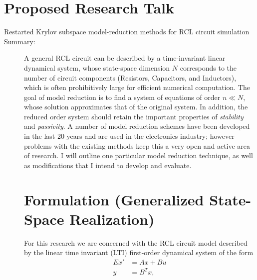\documentclass[letterpaper]{article}
\theoremstyle{remark}
\begin{document}
\section*{Proposed Research Talk}
	\begin{description}
		\item[Restarted Krylov subspace model-reduction methods for 
		RCL circuit simulation]

		\item[Summary:] A general RCL circuit can be described by a time-invariant 
		linear dynamical system, whose state-space dimension $N$ corresponds to the
		number of circuit components (Resistors, Capacitors, and Inductors),
		which is often prohibitively large for efficient numerical computation. The goal
		of model reduction is to find a system of equations of order $n\ll N$, whose solution
		approximates that of the original system.  In addition, the reduced order system 
		should retain the important properties of \emph{stability} and \emph{passivity}.  
		A number of model reduction schemes have been developed in the last 20 years
		and are used in the electronics industry; however problems with the existing methods
		keep this a very open and active area of research.  I will outline one particular 
		model reduction technique, as well as modifications that I intend to develop and 
		evaluate.
   
	 \section{Formulation (Generalized State-Space Realization)}
	 For this research we are concerned with the RCL circuit model described by the 
	 linear time invariant (LTI) first-order dynamical system of the form 
	 \begin{equation}
	 \begin{aligned}
		Ex' &=  Ax + Bu\\
		y &= B^Tx,
	\end{aligned}
	\label{eq:ds1}
	\end{equation}


\end{description}
\end{document}
